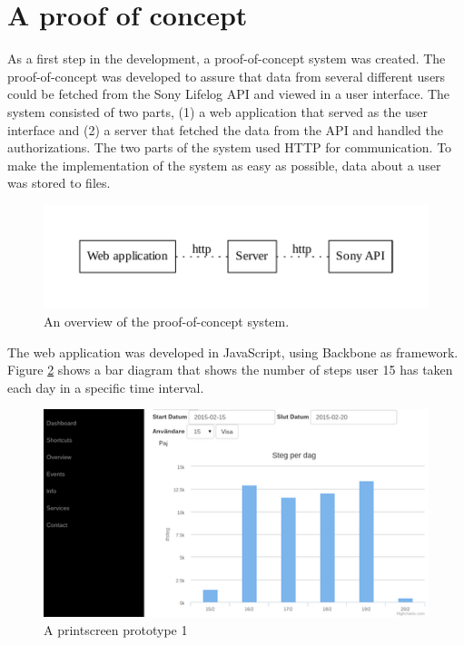 \documentclass{cslthse-msc}
\begin{document}
\section{A proof of concept}

As a first step in the development, a proof-of-concept system was created. The proof-of-concept was developed to assure that data from several different users could be fetched from the Sony Lifelog API and viewed in a user interface. The system consisted of two parts, (1) a web application that served as the user interface and (2) a server that fetched the data from the API and handled the authorizations. The two parts of the system used HTTP for communication. To make the implementation of  the system as easy as possible, data about a user was stored to files. 

\begin{figure}[!hbt]
\centering
\includegraphics[scale=0.8]{firs_verison.pdf} 
\caption{An overview of the proof-of-concept system.}\label{fig:firstV}
\end{figure}

The web application was developed in JavaScript, using Backbone as framework. Figure \ref{fig:firstV_screen} shows a bar diagram that shows the number of steps user 15 has taken each day in a specific time interval. 

\begin{figure}[!hbt]
\centering
\includegraphics[scale=0.8]{first_prototype_screenshot_crop.png} 
\caption{A printscreen prototype 1}\label{fig:firstV_screen}
\end{figure}
\end{document}
